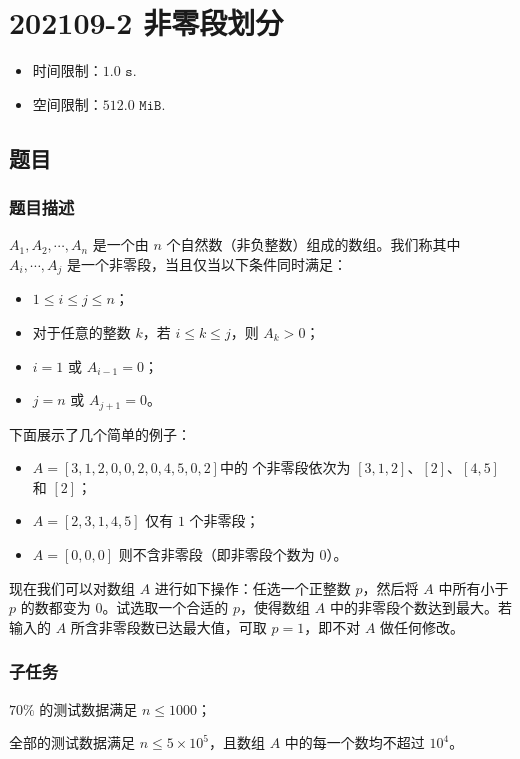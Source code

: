 \section{202109-2 非零段划分}
	\begin{itemize}
		\item 时间限制：$1.0\texttt{ s}$.
		\item 空间限制：$512.0\texttt{ MiB}$.
	\end{itemize}
	\subsection{题目}
		\subsubsection{题目描述}
			\par $A_1, A_2, \cdots, A_n$ 是一个由 $n$ 个自然数（非负整数）组成的数组。我们称其中 $A_i, \cdots, A_j$ 是一个非零段，当且仅当以下条件同时满足：
			\begin{itemize}
				\item $1\leq i\leq j\leq n$；
				\item 对于任意的整数 $k$，若 $i\leq k\leq j$，则 $A_k>0$；
				\item $i=1$ 或 $A_{i-1}=0$；
				\item $j=n$ 或 $A_{j+1}=0$。
			\end{itemize}
			\par 下面展示了几个简单的例子：
			\begin{itemize}
				\item $A = [3, 1, 2, 0, 0, 2, 0, 4, 5, 0, 2]$中的  个非零段依次为 $[3, 1, 2]$、$[2]$、$[4, 5]$ 和 $[2]$；
				\item $A = [2, 3, 1, 4, 5]$ 仅有 $1$ 个非零段；
				\item $A = [0, 0, 0]$ 则不含非零段（即非零段个数为 $0$）。
			\end{itemize}
			\par 现在我们可以对数组 $A$ 进行如下操作：任选一个正整数 $p$，然后将 $A$ 中所有小于 $p$ 的数都变为 $0$。试选取一个合适的 $p$，使得数组 $A$ 中的非零段个数达到最大。若输入的 $A$ 所含非零段数已达最大值，可取 $p=1$，即不对 $A$ 做任何修改。
		\subsubsection{子任务}
			\par $70\%$ 的测试数据满足 $n\leq 1000$；
			\par 全部的测试数据满足 $n\leq 5\times 10^5$，且数组 $A$ 中的每一个数均不超过 $10^4$。
